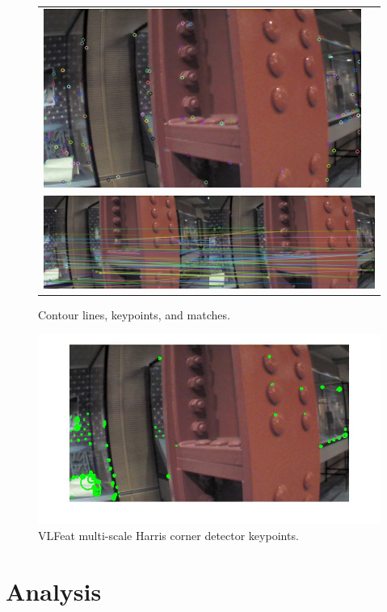 \documentclass{acmsiggraph}
\begin{document}
\begin{figure}[h]
\begin{tabular}{cc}
    \includegraphics[resolution=150, scale=0.75]{images/contour-kp2} \\
    \multicolumn{2}{c}{\includegraphics[resolution=150, scale=0.77]{images/contour-matches}}
  \end{tabular}
  \caption{Contour lines, keypoints, and matches.}
  \label{fig:contour-ex}
\end{figure}

\begin{figure}[h]
  \centering
  \includegraphics[resolution=150, scale=0.75]{images/vlfeat-kp2}
  \caption{VLFeat multi-scale Harris corner detector keypoints.}
  \label{fig:vlfeat-ex}
\end{figure}

\section{Analysis}
\end{document}
